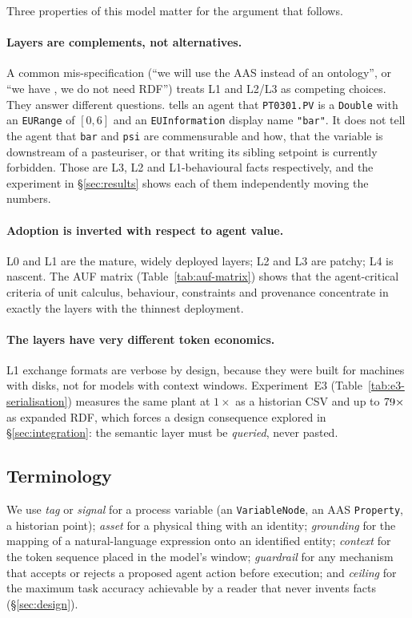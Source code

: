Three properties of this model matter for the argument that follows.

\paragraph{Layers are complements, not alternatives.} A common
mis-specification (``we will use the AAS instead of an ontology'', or ``we
have \opcua, we do not need RDF'') treats L1 and L2/L3 as competing choices.
They answer different questions. \opcua{} tells an agent that
\texttt{PT0301.PV} is a \texttt{Double} with an \texttt{EURange} of
$[0, 6]$ and an \texttt{EUInformation} display name \texttt{"bar"}. It does not
tell the agent that \texttt{bar} and \texttt{psi} are commensurable and how, that
the variable is downstream of a pasteuriser, or that writing its sibling
setpoint is currently forbidden. Those are L3, L2 and L1-behavioural facts
respectively, and the experiment in \S\ref{sec:results} shows each of them
independently moving the numbers.

\paragraph{Adoption is inverted with respect to agent value.} L0 and L1 are the
mature, widely deployed layers; L2 and L3 are patchy; L4 is nascent. The AUF
matrix (Table~\ref{tab:auf-matrix}) shows that the agent-critical criteria of
unit calculus, behaviour, constraints and provenance concentrate in exactly the
layers with the thinnest deployment.

\paragraph{The layers have very different token economics.} L1 exchange formats
are verbose by design, because they were built for machines with disks, not for
models with context windows. Experiment~E3 (Table~\ref{tab:e3-serialisation})
measures the same plant at $1\times$ as a historian CSV and up to
$79\times$ as expanded RDF, which forces a design consequence
explored in \S\ref{sec:integration}: the semantic layer must be
\emph{queried}, never pasted.

\subsection{Terminology}

We use \emph{tag} or \emph{signal} for a process variable (an \opcua{}
\texttt{VariableNode}, an AAS \texttt{Property}, a historian point);
\emph{asset} for a physical thing with an identity; \emph{grounding} for the
mapping of a natural-language expression onto an identified entity;
\emph{context} for the token sequence placed in the model's window;
\emph{guardrail} for any mechanism that accepts or rejects a proposed agent
action before execution; and \emph{ceiling} for the maximum task accuracy
achievable by a reader that never invents facts (\S\ref{sec:design}).

